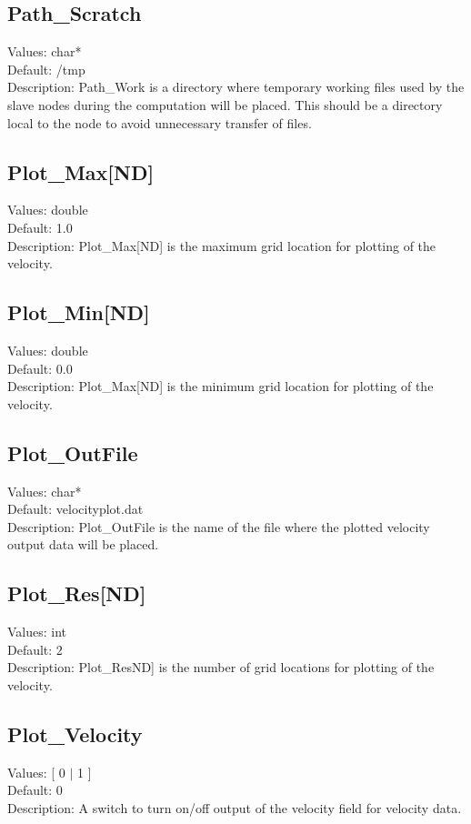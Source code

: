 \documentclass[11pt]{article}
\begin{document}
\subsection{Path\_Scratch}
Values:   char*\\
Default:  /tmp\\
Description:  Path\_Work is a directory where temporary working files used by the slave nodes during the computation will be placed.  This should be a directory local to the node to avoid unnecessary transfer of files.

\subsection{Plot\_Max[ND]}
Values:   double \\
Default:  1.0\\
Description:  Plot\_Max[ND] is the maximum grid location for plotting of the velocity.

\subsection{Plot\_Min[ND]}
Values:   double \\
Default:  0.0\\
Description:  Plot\_Max[ND] is the minimum grid location for plotting of the velocity.

\subsection{Plot\_OutFile}
Values:   char* \\
Default:  velocityplot.dat\\
Description:  Plot\_OutFile is the name of the file where the plotted velocity output data will be placed. 

\subsection{Plot\_Res[ND]}
Values:   int \\
Default:  2\\
Description:  Plot\_ResND] is the number of grid locations for plotting of the velocity.

\subsection{Plot\_Velocity}
Values: [ 0 $|$ 1 ]\\
Default:  0\\
Description:  A switch to turn on/off output of the velocity field for velocity data.
\end{document}
